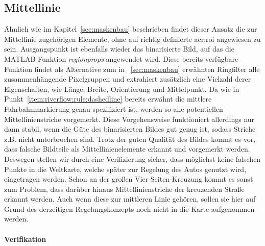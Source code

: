 \subsection{Mittellinie \dcfirstauthorshort}
\label{ssec:fahrspurerkennung:riverflow:mittellinie}
Ähnlich wie im Kapitel~\ref{sec:maskenbau} beschrieben findet dieser Ansatz die zur Mittellinie zugehörigen Elemente, ohne auf richtig definierte \gls{acr:roi} angewiesen zu sein. Ausgangspunkt ist ebenfalls wieder das binarisierte Bild, auf das die MATLAB-Funktion \emph{regionprops} angewendet wird. Diese bereits verfügbare Funktion findet als Alternative zum in ~\ref{sec:maskenbau} erwähnten \glqq Ringfilter\grqq{} alle zusammenhängende Pixelgruppen und extrahiert zusätzlich eine Vielzahl derer Eigenschaften, wie Länge, Breite, Orientierung und Mittelpunkt. Da wie in Punkt~\ref{item:riverflow:rule:dashedline} bereits erwähnt die mittlere Fahrbahnmarkierung genau spezifiziert ist, werden so alle potentiellen Mittellinienstriche vorgemerkt. Diese Vorgehensweise funktioniert allerdings nur dann stabil, wenn die Güte des binarisierten Bildes gut genug ist, sodass Striche z.B. nicht unterbrochen sind. Trotz der guten Qualität des Bildes kommt es vor, dass falsche Bildteile als Mittellinienelemente erkannt und vorgemerkt werden. Deswegen stellen wir durch eine Verifizierung sicher, dass möglichst keine falschen Punkte in die Weltkarte, welche später zur Regelung des Autos genutzt wird, eingetragen werden. Schon an der großen Vier-Seiten-Kreuzung kommt es sonst zum Problem, dass darüber hinaus Mittellinienstriche der kreuzenden Straße erkannt werden. Auch wenn diese zur mittleren Linie gehören, sollen sie hier auf Grund des derzeitigen Regelungskonzepts noch nicht in die Karte aufgenommen werden. 

\paragraph{Verifikation}

